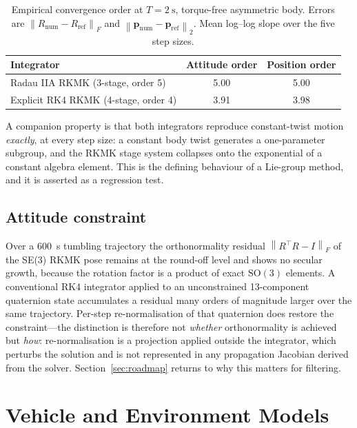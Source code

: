 \documentclass[a4paper,10pt]{article}
\newcommand{\SO}{\mathrm{SO}(3)}
\newcommand{\norm}[1]{\left\lVert #1 \right\rVert}
\theoremstyle{definition}
\begin{document}
\begin{table}[h]
  \centering
  \caption{Empirical convergence order at $T = \SI{2}{\second}$, torque-free
    asymmetric body.  Errors are $\norm{R_{\text{num}} - R_{\text{ref}}}_F$
    and $\norm{\mathbf{p}_{\text{num}} - \mathbf{p}_{\text{ref}}}_2$.  Mean
    log--log slope over the five step sizes.}
  \label{tab:order}
  \small
  \begin{tabular}{lcc}
    \toprule
    Integrator & Attitude order & Position order \\
    \midrule
    Radau IIA RKMK (3-stage, order 5)  & 5.00 & 5.00 \\
    Explicit RK4 RKMK (4-stage, order 4) & 3.91 & 3.98 \\
    \bottomrule
  \end{tabular}
\end{table}

A companion property is that both integrators reproduce constant-twist motion
\emph{exactly}, at every step size: a constant body twist generates a
one-parameter subgroup, and the RKMK stage system collapses onto the
exponential of a constant algebra element.  This is the defining behaviour of
a Lie-group method, and it is asserted as a regression test.

\subsection{Attitude constraint}

Over a \SI{600}{\second} tumbling trajectory the orthonormality residual
$\norm{R^\top R - I}_F$ of the SE(3) RKMK pose remains at the round-off
level and shows no secular growth, because the rotation factor is a product of
exact $\SO$ elements.  A conventional RK4 integrator applied to an
unconstrained 13-component quaternion state accumulates a residual many orders
of magnitude larger over the same trajectory.  Per-step re-normalisation of
that quaternion does restore the constraint---the distinction is therefore not
\emph{whether} orthonormality is achieved but \emph{how}: re-normalisation is a
projection applied outside the integrator, which perturbs the solution and is
not represented in any propagation Jacobian derived from the solver.
Section~\ref{sec:roadmap} returns to why this matters for filtering.

\section{Vehicle and Environment Models}
\label{sec:models}
\end{document}
